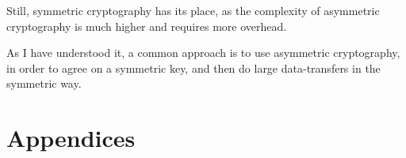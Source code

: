 \documentclass{article}
\begin{document}
Still, symmetric cryptography has its place, as the complexity of asymmetric cryptography is much higher and requires more overhead. 

As I have understood it, a common approach is to use asymmetric cryptography, in order to agree on a symmetric key, and then do large data-transfers in the symmetric way. 


\section{Appendices}


\newpage

\nocite{*}



\end{document}
